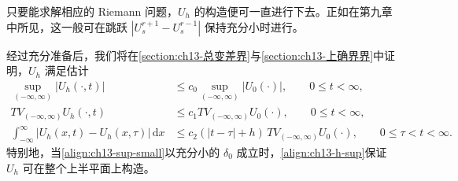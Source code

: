 \documentclass[../../main.tex]{subfiles}
\begin{document}
只要能求解相应的 Riemann 问题，$U_h$ 的构造便可一直进行下去。正如在第九章中所见，这一般可在跳跃 $|U_s^{r+1}-U_s^{r-1}|$ 保持充分小时进行。

经过充分准备后，我们将在\cref{section:ch13-总变差界}与\cref{section:ch13-上确界界}中证明，$U_h$ 满足估计
\begin{align}
\sup_{(-\infty,\infty)}|U_h(\cdot,t)|&\leqslant c_0\sup_{(-\infty,\infty)}|U_0(\cdot)|,\qquad 0\leqslant t<\infty,\label{align:ch13-h-sup}\\
TV_{(-\infty,\infty)}U_h(\cdot,t)&\leqslant c_1TV_{(-\infty,\infty)}U_0(\cdot),\qquad 0\leqslant t<\infty,\label{align:ch13-h-tv}\\
\int_{-\infty}^{\infty}|U_h(x,t)-U_h(x,\tau)|\,\mathrm{d}x&\leqslant c_2(|t-\tau|+h)\,TV_{(-\infty,\infty)}U_0(\cdot),\qquad 0\leqslant\tau<t<\infty.
\label{align:ch13-h-lip}
\end{align}
特别地，当\eqref{align:ch13-sup-small}以充分小的 $\delta_0$ 成立时，\eqref{align:ch13-h-sup}保证 $U_h$ 可在整个上半平面上构造。
\end{document}
